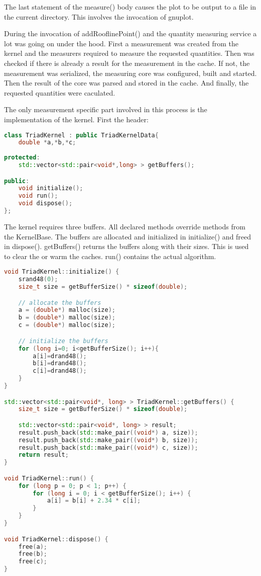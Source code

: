 \documentclass[a4paper,12pt]{article}
\begin{document}
The last statement of the measure() body causes the plot to be output to a file
in the current directory. This involves the invocation of gnuplot.

During the invocation of addRooflinePoint() and the quantity measuring service a
lot was going on under the hood. First a measurement was created from the
kernel and the measurers required to measure the requested quantities. Then was
checked if there is already a result for the measurement in the cache. If not,
the measurement was serialized, the measuring core was configured, built
and started. Then the result of the core was parsed and stored in the cache.
And finally, the requested quantities were caculated.

The only measurement specific part involved in this process is the
implementation of the kernel. First the header:

\begin{lstlisting}[language=C++]
class TriadKernel : public TriadKernelData{
	double *a,*b,*c;
	
protected:
	std::vector<std::pair<void*,long> > getBuffers();

public:
	void initialize();
	void run();
	void dispose();
};
\end{lstlisting}

The kernel requires three buffers. All declared methods override methods
from the KernelBase. The buffers are allocated and initialized in
initialize() and freed in dispose(). getBuffers() returns the buffers along with
their sizes. This is used to clear the or warm the caches. run() contains the
actual algorithm. 


\begin{lstlisting}[language=C++]
void TriadKernel::initialize() {
	srand48(0);
	size_t size = getBufferSize() * sizeof(double);

	// allocate the buffers
	a = (double*) malloc(size);
	b = (double*) malloc(size);
	c = (double*) malloc(size);

	// initialize the buffers
	for (long i=0; i<getBufferSize(); i++){
		a[i]=drand48();
		b[i]=drand48();
		c[i]=drand48();
	}
}

std::vector<std::pair<void*, long> > TriadKernel::getBuffers() {
	size_t size = getBufferSize() * sizeof(double);

	std::vector<std::pair<void*, long> > result;
	result.push_back(std::make_pair((void*) a, size));
	result.push_back(std::make_pair((void*) b, size));
	result.push_back(std::make_pair((void*) c, size));
	return result;
}

void TriadKernel::run() {
	for (long p = 0; p < 1; p++) {
		for (long i = 0; i < getBufferSize(); i++) {
			a[i] = b[i] + 2.34 * c[i];
		}
	}
}

void TriadKernel::dispose() {
	free(a);
	free(b);
	free(c);
}

\end{lstlisting}
\end{document}

